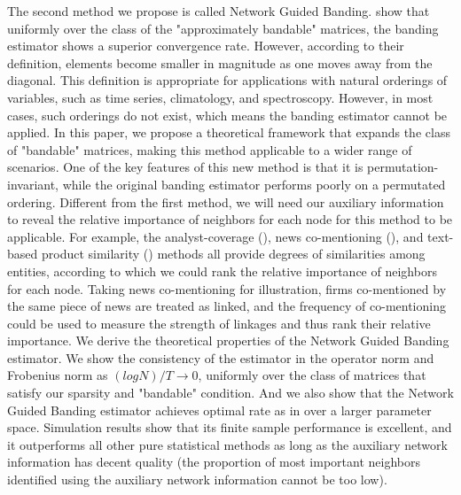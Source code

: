 The second method we propose is called Network Guided Banding. \cite{bickel2008RegularizedEstimation} show that uniformly over the class of the "approximately bandable" matrices, the banding estimator shows a superior convergence rate. However, according to their definition, elements become smaller in magnitude as one moves away from the diagonal. This definition is appropriate for applications with natural orderings of variables, such as time series, climatology, and spectroscopy. However, in most cases, such orderings do not exist, which means the banding estimator cannot be applied. In this paper, we propose a theoretical framework that expands the class of "bandable" matrices, making this method applicable to a wider range of scenarios. One of the key features of this new method is that it is permutation-invariant, while the original banding estimator performs poorly on a permutated ordering. Different from the first method, we will need our auxiliary information to reveal the relative importance of neighbors for each node for this method to be applicable. For example, the analyst-coverage (\cite{israelsen2016does}), news co-mentioning (\cite{ge2021dynamic}), and text-based product similarity (\cite{hoberg2016text}) methods all provide degrees of similarities among entities, according to which we could rank the relative importance of neighbors for each node. Taking news co-mentioning for illustration, firms co-mentioned by the same piece of news are treated as linked, and the frequency of co-mentioning could be used to measure the strength of linkages and thus rank their relative importance. We derive the theoretical properties of the Network Guided Banding estimator. We show the consistency of the estimator in the operator norm and Frobenius norm as $(log N)/T\to 0$, uniformly over the class of matrices that satisfy our sparsity and "bandable" condition.  And we also show that the Network Guided Banding estimator achieves optimal rate as in \cite{bickel2008RegularizedEstimation} over a larger parameter space. Simulation results show that its finite sample performance is excellent, and it outperforms all other pure statistical methods as long as the auxiliary network information has decent quality (the proportion of most important neighbors identified using the auxiliary network information cannot be too low).

